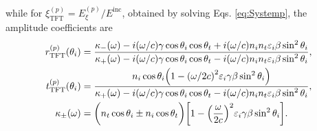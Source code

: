 %
while for $\xi ^{(p)}_\text{TFT} = E_\xi^{(p)}/E^\text{inc}$, obtained by solving Eqs. \eqref{eq:Systemp}, the amplitude coefficients are \cite{lazzari_granfilm_2002,bedeaux_optical_2004,cuanalo_phase_2024}
%
\begin{subequations}%
\begin{align}
	r^{(p)}_\text{TFT}(\theta_i) &= 
		  \frac{ \kappa_-(\omega) - i (\omega/c) \gamma\cos\theta_i\cos\theta_t +
							i (\omega/c)  n_i n_t \varepsilon_i \beta \sin^2 \theta_i }
			   { \kappa_+(\omega) - i (\omega/c) \gamma\cos\theta_i\cos\theta_t -
			   				i (\omega/c)  n_i n_t \varepsilon_i \beta \sin^2 \theta_i },
	\label{eq:rpTFT}\\
	t^{(p)}_\text{TFT}(\theta_i) &= 
		  \frac{ n_i \cos\theta_i \qty(1-\qty(\omega/2c)^2\varepsilon_{i}\gamma\beta \sin^{2}\theta_i) }
				{ \kappa_+(\omega) - i (\omega/c) \gamma\cos\theta_i\cos\theta_t -
							i (\omega/c)  n_i n_t \varepsilon_i \beta \sin^2 \theta_i },
				\\	
	\kappa_{\pm}(\omega) &= \bigg( n_t \cos\theta_i \pm n_i \cos\theta_t \bigg)
							\qty[1-\qty(\frac{\omega}{2c})^2\varepsilon_{i}\gamma\beta \sin^{2}\theta_i].
\end{align}%
\label{eq:rtpTFT}%
\end{subequations}%

